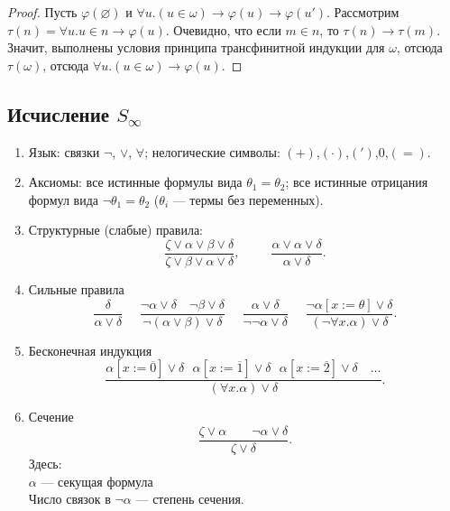 \begin{proof}
Пусть $\varphi(\varnothing)$ и $\forall u.(u \in \omega) \rightarrow \varphi(u) \rightarrow \varphi(u')$.
Рассмотрим $\tau(n) = \forall u.u \in n \rightarrow \varphi(u)$. Очевидно,
что если $m \in n$, то $\tau(n) \rightarrow \tau(m)$. Значит, выполнены условия принципа
трансфинитной индукции для $\omega$, отсюда $\tau(\omega)$, отсюда $\forall u.(u \in \omega) \rightarrow \varphi(u)$.
\end{proof}


\subsection{Исчисление $S_\infty$}
\begin{enumerate}
\item Язык: связки $\neg$, $\vee$, $\forall$; нелогические символы: $(+)$,$(\cdot)$,$(')$,$0$,$(=)$.
\item Аксиомы: все истинные формулы вида $\theta_1=\theta_2$; все истинные отрицания формул вида $\neg\theta_1=\theta_2$
($\theta_i$ --- термы без переменных).
\item Структурные (слабые) правила:
\[ \dfrac{\zeta\vee\alpha\vee\beta\vee\delta}{\zeta\vee\beta\vee\alpha\vee\delta}, ~~~~~~~~~~~
\dfrac{\alpha\vee\alpha\vee\delta}{\alpha\vee\delta}. \]

\item Сильные правила
\[\dfrac{\delta}{\alpha\vee\delta}~~~~~~
\dfrac{\neg\alpha\vee\delta\quad\neg\beta\vee\delta}{\neg(\alpha\vee\beta)\vee\delta}~~~~~~
\dfrac{\alpha\vee\delta}{\neg\neg\alpha\vee\delta}~~~~~~
\dfrac{\neg\alpha[x := \theta]\vee\delta}{(\neg\forall x.\alpha)\vee\delta}.\]

\item Бесконечная индукция
\[ \dfrac{\alpha[x:=\overline{0}]\vee\delta~~~
\alpha[x:=\overline{1}]\vee\delta~~~
\alpha[x:=\overline{2}]\vee\delta\quad\dots}{(\forall x.\alpha)\vee\delta}.\]

\item Сечение
\[ \dfrac{\zeta\vee\alpha  \quad\quad \neg\alpha\vee\delta}
{\zeta\vee\delta}. \]
Здесь: \\
$\alpha$ --- секущая формула \\
Число связок в $\neg\alpha$ --- степень сечения.
\end{enumerate}

